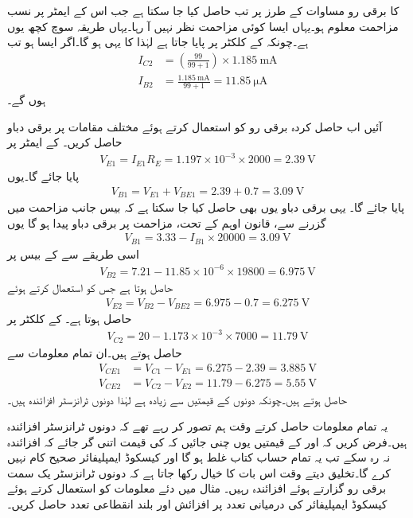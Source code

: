  کا برقی رو مساوات  کے طرز پر تب حاصل کیا جا سکتا ہے جب اس کے ایمٹر پر نسب مزاحمت معلوم ہو۔یہاں ایسا کوئی مزاحمت نظر نہیں آ رہا۔یہاں طریقہ سوچ کچھ یوں ہے۔چونکہ  کے کلکٹر  پر  پایا جاتا ہے لہٰذا  کا  یہی ہو گا۔اگر ایسا ہو تب
\begin{align*}
I_{C2}&=\left(\frac{99}{99+1}\right) \times \SI{1.185}{\milli \ampere}\\
I_{B2}&=\frac{\SI{1.185}{\milli \ampere}}{99+1}=\SI{11.85}{\micro \ampere}
\end{align*} 
ہوں گے۔

آئیں اب حاصل کردہ برقی رو کو استعمال کرتے ہوئے مختلف مقامات پر برقی دباو حاصل کریں۔ کے ایمٹر پر
\begin{align*}
V_{E1}=I_{E1} R_E=1.197 \times 10^{-3} \times 2000=\SI{2.39}{\volt}
\end{align*}
پایا جائے گا۔یوں
\begin{align*}
V_{B1}=V_{E1}+V_{BE1}=2.39+0.7=\SI{3.09}{\volt}
\end{align*}
پایا جائے گا۔ یہی برقی دباو یوں بھی حاصل کیا جا سکتا ہے کہ بیس  جانب  مزاحمت میں  گزرنے سے،   قانون اوہم  کے تحت، مزاحمت پر  برقی دباو پیدا ہو گا یوں
\begin{align*}
V_{B1}=3.33-I_{B1} \times 20000=\SI{3.09}{\volt}
\end{align*}
اسی طریقے سے   کے بیس  پر
\begin{align*}
V_{B2}=7.21 -11.85 \times 10^{-6} \times 19800=\SI{6.975}{\volt} 
\end{align*}
حاصل ہوتا ہے جس کو استعمال کرتے ہوئے
\begin{align*}
V_{E2}=V_{B2}-V_{BE2}=6.975-0.7=\SI{6.275}{\volt}
\end{align*}
حاصل ہوتا ہے۔ کے کلکٹر  پر
\begin{align*}
V_{C2}=20 -1.173 \times 10^{-3} \times 7000=\SI{11.79}{\volt}
\end{align*}
حاصل ہوتے ہیں۔ان تمام معلومات سے
\begin{align*}
V_{CE1}&=V_{C1}-V_{E1}=6.275-2.39=\SI{3.885}{\volt}\\
V_{CE2}&=V_{C2}-V_{E2}=11.79-6.275=\SI{5.55}{\volt}
\end{align*}
حاصل ہوتے ہیں۔چونکہ دونوں  کے قیمتیں  سے زیادہ ہے لہٰذا دونوں ٹرانزسٹر افزائندہ ہیں۔

یہ تمام معلومات حاصل کرتے وقت ہم تصور کر رہے تھے کہ دونوں ٹرانزسٹر افزائندہ ہیں۔فرض کریں کہ  اور  کے قیمتیں یوں چنی جائیں کہ  کی قیمت اتنی گر جائے کہ  افزائندہ نہ رہ سکے تب یہ تمام حساب کتاب غلط ہو گا اور کیسکوڈ ایمپلیفائر صحیح کام نہیں کرے گا۔تخلیق دیتے وقت اس بات کا خیال رکھا جاتا ہے کہ دونوں ٹرانزسٹر یک سمت  برقی رو گزارتے ہوئے افزائندہ رہیں۔
مثال  میں دئے معلومات کو استعمال کرتے ہوئے کیسکوڈ ایمپلیفائر کی درمیانی تعدد پر افزائش  اور بلند انقطاعی تعدد  حاصل کریں۔

